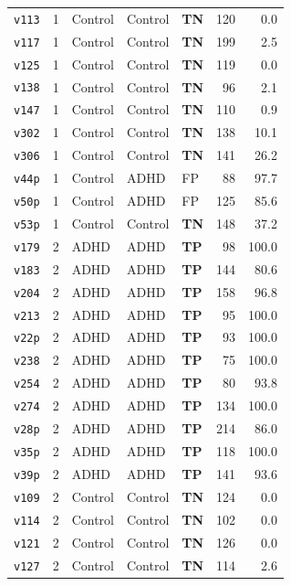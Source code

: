 \begin{longtable}{lclllrr}
  \texttt{v113} & 1 & Control & Control & \textbf{TN} & 120 & 0.0 \\
  \texttt{v117} & 1 & Control & Control & \textbf{TN} & 199 & 2.5 \\
  \texttt{v125} & 1 & Control & Control & \textbf{TN} & 119 & 0.0 \\
  \texttt{v138} & 1 & Control & Control & \textbf{TN} & 96 & 2.1 \\
  \texttt{v147} & 1 & Control & Control & \textbf{TN} & 110 & 0.9 \\
  \texttt{v302} & 1 & Control & Control & \textbf{TN} & 138 & 10.1 \\
  \texttt{v306} & 1 & Control & Control & \textbf{TN} & 141 & 26.2 \\
  \texttt{v44p} & 1 & Control & ADHD & FP & 88 & 97.7 \\
  \texttt{v50p} & 1 & Control & ADHD & FP & 125 & 85.6 \\
  \texttt{v53p} & 1 & Control & Control & \textbf{TN} & 148 & 37.2 \\
  \midrule
  \texttt{v179} & 2 & ADHD & ADHD & \textbf{TP} & 98 & 100.0 \\
  \texttt{v183} & 2 & ADHD & ADHD & \textbf{TP} & 144 & 80.6 \\
  \texttt{v204} & 2 & ADHD & ADHD & \textbf{TP} & 158 & 96.8 \\
  \texttt{v213} & 2 & ADHD & ADHD & \textbf{TP} & 95 & 100.0 \\
  \texttt{v22p} & 2 & ADHD & ADHD & \textbf{TP} & 93 & 100.0 \\
  \texttt{v238} & 2 & ADHD & ADHD & \textbf{TP} & 75 & 100.0 \\
  \texttt{v254} & 2 & ADHD & ADHD & \textbf{TP} & 80 & 93.8 \\
  \texttt{v274} & 2 & ADHD & ADHD & \textbf{TP} & 134 & 100.0 \\
  \texttt{v28p} & 2 & ADHD & ADHD & \textbf{TP} & 214 & 86.0 \\
  \texttt{v35p} & 2 & ADHD & ADHD & \textbf{TP} & 118 & 100.0 \\
  \texttt{v39p} & 2 & ADHD & ADHD & \textbf{TP} & 141 & 93.6 \\
  \texttt{v109} & 2 & Control & Control & \textbf{TN} & 124 & 0.0 \\
  \texttt{v114} & 2 & Control & Control & \textbf{TN} & 102 & 0.0 \\
  \texttt{v121} & 2 & Control & Control & \textbf{TN} & 126 & 0.0 \\
  \texttt{v127} & 2 & Control & Control & \textbf{TN} & 114 & 2.6 \\

\end{longtable}
